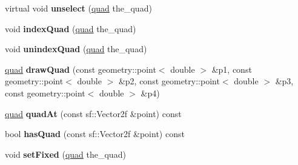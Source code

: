 \begin{DoxyCompactItemize}
\item 
\hypertarget{classophidian_1_1gui_1_1circuit__canvas_aa836133f7dc92a0c39afc38674cad655}{virtual void {\bfseries unselect} (\hyperlink{structophidian_1_1gui_1_1quad}{quad} the\-\_\-quad)}\label{classophidian_1_1gui_1_1circuit__canvas_aa836133f7dc92a0c39afc38674cad655}

\item 
\hypertarget{classophidian_1_1gui_1_1circuit__canvas_ad091250ed357f67073886d3151bf3ae8}{void {\bfseries index\-Quad} (\hyperlink{structophidian_1_1gui_1_1quad}{quad} the\-\_\-quad)}\label{classophidian_1_1gui_1_1circuit__canvas_ad091250ed357f67073886d3151bf3ae8}

\item 
\hypertarget{classophidian_1_1gui_1_1circuit__canvas_a22dff5b0ea147195db19977a0db9cbe9}{void {\bfseries unindex\-Quad} (\hyperlink{structophidian_1_1gui_1_1quad}{quad} the\-\_\-quad)}\label{classophidian_1_1gui_1_1circuit__canvas_a22dff5b0ea147195db19977a0db9cbe9}

\item 
\hypertarget{classophidian_1_1gui_1_1circuit__canvas_aedd338cc9b4bab07312c2b55b5b3a5df}{\hyperlink{structophidian_1_1gui_1_1quad}{quad} {\bfseries draw\-Quad} (const geometry\-::point$<$ double $>$ \&p1, const geometry\-::point$<$ double $>$ \&p2, const geometry\-::point$<$ double $>$ \&p3, const geometry\-::point$<$ double $>$ \&p4)}\label{classophidian_1_1gui_1_1circuit__canvas_aedd338cc9b4bab07312c2b55b5b3a5df}

\item 
\hypertarget{classophidian_1_1gui_1_1circuit__canvas_ab1e5fc2efc3c899284cb7bafbd9b4015}{\hyperlink{structophidian_1_1gui_1_1quad}{quad} {\bfseries quad\-At} (const sf\-::\-Vector2f \&point) const }\label{classophidian_1_1gui_1_1circuit__canvas_ab1e5fc2efc3c899284cb7bafbd9b4015}

\item 
\hypertarget{classophidian_1_1gui_1_1circuit__canvas_aa18a22d68616ec7f4d77e50c55c40569}{bool {\bfseries has\-Quad} (const sf\-::\-Vector2f \&point) const }\label{classophidian_1_1gui_1_1circuit__canvas_aa18a22d68616ec7f4d77e50c55c40569}

\item 
\hypertarget{classophidian_1_1gui_1_1circuit__canvas_ae4453b5771c88777f16d37a9c29986a2}{void {\bfseries set\-Fixed} (\hyperlink{structophidian_1_1gui_1_1quad}{quad} the\-\_\-quad)}\label{classophidian_1_1gui_1_1circuit__canvas_ae4453b5771c88777f16d37a9c29986a2}


\end{DoxyCompactItemize}
